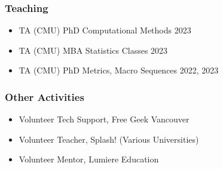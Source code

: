 \documentclass[12pt]{article}   %
\begin{document}

\subsubsection*{Teaching}
\begin{itemize}
  \item TA (CMU) \hspace{7 em} PhD Computational Methods  \hfill 2023
  \item TA (CMU) \hspace{7 em} MBA Statistics Classes \hfill 2023
  \item TA (CMU) \hspace{7 em} PhD Metrics, Macro Sequences \hfill 2022, 2023
\end{itemize}




\subsubsection*{Other Activities}
\begin{itemize}
  \item Volunteer Tech Support, Free Geek Vancouver 
  
  \item Volunteer Teacher, Splash! (Various Universities)
  
  \item Volunteer Mentor, Lumiere Education
\end{itemize}
\end{document}
